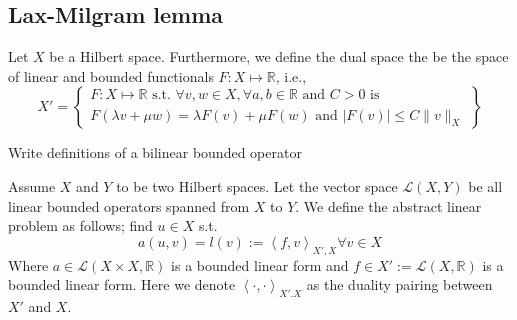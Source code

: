 \subsection{Lax-Milgram lemma}%
\label{sub:lax_milgram_lemma}


\begin{definition}
    \label{def:linear_function}
Let $X$ be a Hilbert space. Furthermore, we define the dual space the be the space of linear and bounded functionals $F: X  \mapsto \mathbb{R} $, i.e., \[
X'  =
\left.
\begin{cases}
F: X  \mapsto \mathbb{R} \text{ s.t. }\forall v,w \in X, \forall a,b \in \mathbb{R} \text{ and } C> 0 \text{ is }   \\
  F\left( \lambda v + \mu w  \right) = \lambda F(v) + \mu F(w) \text{ and } \left\lvert F\left( v \right)  \right\rvert \le C \| v \|_{ X  }^{  }
\end{cases}
  \right\}
\]
\end{definition}

\begin{definition}
    \label{def:bilinear_function}
    Write definitions of a bilinear bounded operator
\end{definition}

\begin{definition}
    \label{def:abstract_linear_problem}
    Assume $X$ and $Y$  to be two Hilbert spaces. Let the vector space $\mathcal{L}( X,Y)  $ be all linear bounded operators spanned from $X$ to $Y$. We define the abstract linear problem as follows; find $u \in X$ s.t. \[
    a( u,v)  = l(v ) := \left<f,v \right>_{X' , X}  \forall v \in X
    \]
    Where $a \in  \mathcal{L} ( X \times X,\mathbb{R} ) $ is a bounded linear form and $f \in X':= \mathcal{L} ( X,\mathbb{R} )  $ is a bounded linear form. Here we denote $\left<\cdot ,\cdot  \right>_{X' .X} $ as the duality pairing between $X' $
    and $X $.

\end{definition}


